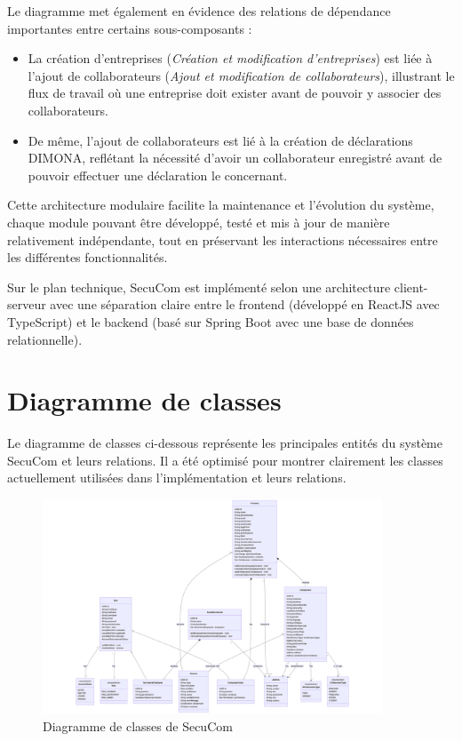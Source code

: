 \documentclass[12pt,a4paper]{report}
\begin{document}
Le diagramme met également en évidence des relations de dépendance importantes entre certains sous-composants :
\begin{itemize}
  \item La création d'entreprises (\textit{Création et modification d'entreprises}) est liée à l'ajout de collaborateurs (\textit{Ajout et modification de collaborateurs}), illustrant le flux de travail où une entreprise doit exister avant de pouvoir y associer des collaborateurs.
  \item De même, l'ajout de collaborateurs est lié à la création de déclarations DIMONA, reflétant la nécessité d'avoir un collaborateur enregistré avant de pouvoir effectuer une déclaration le concernant.
\end{itemize}

Cette architecture modulaire facilite la maintenance et l'évolution du système, chaque module pouvant être développé, testé et mis à jour de manière relativement indépendante, tout en préservant les interactions nécessaires entre les différentes fonctionnalités.

Sur le plan technique, SecuCom est implémenté selon une architecture client-serveur avec une séparation claire entre le frontend (développé en ReactJS avec TypeScript) et le backend (basé sur Spring Boot avec une base de données relationnelle).

\section{Diagramme de classes}

Le diagramme de classes ci-dessous représente les principales entités du système SecuCom et leurs relations. Il a été optimisé pour montrer clairement les classes actuellement utilisées dans l'implémentation et leurs relations.

\begin{figure}[h]
\centering
\includegraphics[width=0.9\textwidth]{ClassDiagram.png}
\caption{Diagramme de classes de SecuCom}
\end{figure}
\end{document}
